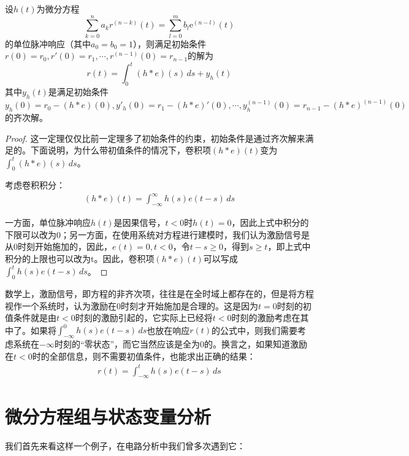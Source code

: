 \documentclass{ctexbook}
\begin{document}
\begin{theorem}
    设$h(t)$为微分方程
    \[\sum_{k=0}^{n}a_{k} r^{(n-k)}(t)=\sum_{l=0}^{m}b_{l} \mathrm{e}^{(n-l)}(t)\]
    的单位脉冲响应（其中$a_0=b_0=1$），则满足初始条件$r(0)=r_0,r'(0)=r_1,\cdots,r^{(n-1)}(0)=r_{n-1}$的解为
    \[r(t)=\int_{0}^{t} (h*e)(s)\,ds + y_h(t)\]
    其中$y_h(t)$是满足初始条件$y_h(0)=r_0-(h*e)(0),y'_h(0)=r_1-(h*e)'(0),\cdots,y_h^{(n-1)}(0)=r_{n-1}-(h*e)^{(n-1)}(0)$的齐次解。
\end{theorem}
\begin{proof}
    这一定理仅仅比前一定理多了初始条件的约束，初始条件是通过齐次解来满足的。下面说明，为什么带初值条件的情况下，卷积项$(h*e)(t)$变为$\int_{0}^{t} (h*e)(s)\,ds$。

    考虑卷积积分：\begin{align*}
        (h*e)(t)=\int_{-\infty}^{\infty} h(s)e(t-s)\,ds
    \end{align*}

    一方面，单位脉冲响应$h(t)$是因果信号，$t<0$时$h(t)=0$，因此上式中积分的下限可以改为0；另一方面，在使用系统对方程进行建模时，我们认为激励信号是从0时刻开始施加的，因此，$e(t)=0,t<0$，令$t-s\geq 0$，得到$s\geq t$，即上式中积分的上限也可以改为t。因此，卷积项$(h*e)(t)$可以写成$\int_{0}^{t} h(s)e(t-s)\,ds$。
\end{proof}

数学上，激励信号，即方程的非齐次项，往往是在全时域上都存在的，但是将方程视作一个系统时，认为激励在0时刻才开始施加是合理的。这是因为$t=0$时刻的初值条件就是由$t<0$时刻的激励引起的，它实际上已经将$t<0$时刻的激励考虑在其中了。如果将$\int_{-\infty}^0 h(s)e(t-s)\,ds$也放在响应$r(t)$的公式中，则我们需要考虑系统在$-\infty$时刻的“零状态”，而它当然应该是全为0的。换言之，如果知道激励在$t<0$时的全部信息，则不需要初值条件，也能求出正确的结果：\begin{align*}
    r(t)=\int_{-\infty}^{t} h(s)e(t-s)\,ds
\end{align*}

\section{微分方程组与状态变量分析}\label{sec:Equation_System}

我们首先来看这样一个例子，在电路分析中我们曾多次遇到它：
\end{document}

